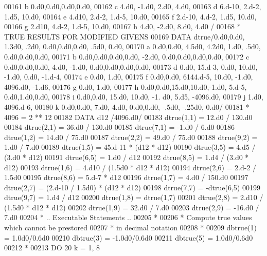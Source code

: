 \begin{DoxyCode}
00161      b          0.d0,0.d0,0.d0,0.d0,
00162      c          4.d0, -1.d0, 2.d0, 4.d0,
00163      d          6.d-10, 2.d-2, 1.d5, 10.d0,
00164      e          4.d10, 2.d-2, 1.d-5, 10.d0,
00165      f          2.d-10, 4.d-2, 1.d5, 10.d0,
00166      g          2.d10, 4.d-2, 1.d-5, 10.d0,
00167      h          4.d0, -2.d0, 8.d0, 4.d0    /
00168 \textcolor{comment}{*    TRUE RESULTS FOR MODIFIED GIVENS}
00169       \textcolor{keyword}{DATA} dtrue/0.d0,0.d0, 1.3d0, .2d0, 0.d0,0.d0,0.d0, .5d0, 0.d0,
00170      a           0.d0,0.d0, 4.5d0, 4.2d0, 1.d0, .5d0, 0.d0,0.d0,0.d0,
00171      b           0.d0,0.d0,0.d0,0.d0, -2.d0, 0.d0,0.d0,0.d0,0.d0,
00172      c           0.d0,0.d0,0.d0, 4.d0, -1.d0, 0.d0,0.d0,0.d0,0.d0,
00173      d           0.d0, 15.d-3, 0.d0, 10.d0, -1.d0, 0.d0, -1.d-4,
00174      e           0.d0, 1.d0,
00175      f           0.d0,0.d0, 6144.d-5, 10.d0, -1.d0, 4096.d0, -1.d6,
00176      g           0.d0, 1.d0,
00177      h           0.d0,0.d0,15.d0,10.d0,-1.d0, 5.d-5, 0.d0,1.d0,0.d0,
00178      i           0.d0,0.d0, 15.d0, 10.d0, -1. d0, 5.d5, -4096.d0,
00179      j           1.d0, 4096.d-6,
00180      k           0.d0,0.d0, 7.d0, 4.d0, 0.d0,0.d0, -.5d0, -.25d0, 0.d0/
00181 \textcolor{comment}{*                   4096 = 2 ** 12}
00182       \textcolor{keyword}{DATA} d12  /4096.d0/
00183       dtrue(1,1) = 12.d0 / 130.d0
00184       dtrue(2,1) = 36.d0 / 130.d0
00185       dtrue(7,1) = -1.d0 / 6.d0
00186       dtrue(1,2) = 14.d0 / 75.d0
00187       dtrue(2,2) = 49.d0 / 75.d0
00188       dtrue(9,2) = 1.d0 / 7.d0
00189       dtrue(1,5) = 45.d-11 * (d12 * d12)
00190       dtrue(3,5) = 4.d5 / (3.d0 * d12)
00191       dtrue(6,5) = 1.d0 / d12
00192       dtrue(8,5) = 1.d4 / (3.d0 * d12)
00193       dtrue(1,6) = 4.d10 / (1.5d0 * d12 * d12)
00194       dtrue(2,6) = 2.d-2 / 1.5d0
00195       dtrue(8,6) = 5.d-7 * d12
00196       dtrue(1,7) = 4.d0 / 150.d0
00197       dtrue(2,7) = (2.d-10 / 1.5d0) * (d12 * d12)
00198       dtrue(7,7) = -dtrue(6,5)
00199       dtrue(9,7) = 1.d4 / d12
00200       dtrue(1,8) = dtrue(1,7)
00201       dtrue(2,8) = 2.d10 / (1.5d0 * d12 * d12)
00202       dtrue(1,9) = 32.d0 / 7.d0
00203       dtrue(2,9) = -16.d0 / 7.d0
00204 \textcolor{comment}{*     .. Executable Statements ..}
00205 \textcolor{comment}{*}
00206 \textcolor{comment}{*     Compute true values which cannot be prestored}
00207 \textcolor{comment}{*     in decimal notation}
00208 \textcolor{comment}{*}
00209       dbtrue(1) = 1.0d0/0.6d0
00210       dbtrue(3) = -1.0d0/0.6d0
00211       dbtrue(5) = 1.0d0/0.6d0
00212 \textcolor{comment}{*}
00213       \textcolor{keywordflow}{DO} 20 k = 1, 8

\end{DoxyCode}
